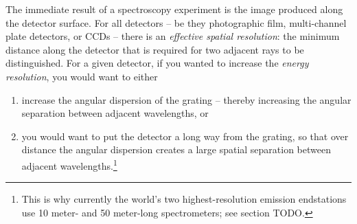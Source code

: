 The immediate result of a spectroscopy experiment is the image produced along the detector surface.  For all detectors -- be they photographic film, multi-channel plate detectors, or CCDs -- there is an \emph{effective spatial resolution}: the minimum distance along the detector that is required for two adjacent rays to be distinguished.  For a given detector, if you wanted to increase the \emph{energy resolution}, you would want to either 
\begin{enumerate}
\item increase the angular dispersion of the grating -- thereby increasing the angular separation between adjacent wavelengths, or 
\item you would want to put the detector a long way from the grating, so that over distance the angular dispersion creates a large spatial separation between adjacent wavelengths.\footnote{This is why currently the world's two highest-resolution emission endstations use 10 meter- and 50 meter-long spectrometers; see section TODO.}
\end{enumerate}

